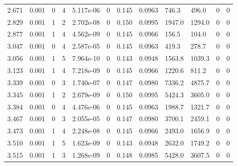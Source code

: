 \documentclass[preview]{standalone}
\begin{document}
{{\begin{tabular}{L{1.2cm}C{1.2cm} C{0.3cm}C{0.5cm} C{1.4cm}C{1.4cm} C{1.4cm}C{1.4cm} C{1.6cm}C{1.6cm} C{1.6cm}C{1.6cm}}
  2.671  &  0.001  & 0     &  4 &  5.117e-06  & 0  &  0.145&   0.0963& 746.3 & 496.0   &  0 & 0  \\ 
  2.829  &  0.001  & 1     &  2 &  2.702e-08  & 0  &  0.150&   0.0995& 1947.0 & 1294.0   &  0 & 0  \\ 
  2.877  &  0.001  & 1     &  4 &  4.562e-09  & 0  &  0.145&   0.0966& 156.5 & 104.0   &  0 & 0  \\ 
  3.047  &  0.001  & 0     &  4 &  2.587e-05  & 0  &  0.145&   0.0963& 419.3 & 278.7   &  0 & 0  \\ 
  3.056  &  0.001  & 1     &  5 &  7.964e-10  & 0  &  0.143&   0.0948& 1563.8 & 1039.3   &  0 & 0  \\ 
  3.123  &  0.001  & 1     &  4 &  7.218e-09  & 0  &  0.145&   0.0966& 1220.6 & 811.2   &  0 & 0  \\ 
  3.339  &  0.001  & 0     &  3 &  1.740e-07  & 0  &  0.147&   0.0980& 7336.2 & 4875.7   &  0 & 0  \\ 
  3.345  &  0.001  & 1     &  2 &  2.679e-09  & 0  &  0.150&   0.0995& 5424.3 & 3605.0   &  0 & 0  \\ 
  3.384  &  0.001  & 0     &  4 &  4.476e-06  & 0  &  0.145&   0.0963& 1988.7 & 1321.7   &  0 & 0  \\ 
  3.467  &  0.001  & 0     &  3 &  2.055e-05  & 0  &  0.147&   0.0980& 3700.1 & 2459.1   &  0 & 0  \\ 
  3.473  &  0.001  & 1     &  4 &  2.248e-08  & 0  &  0.145&   0.0966& 2493.0 & 1656.9   &  0 & 0  \\ 
  3.510  &  0.001  & 1     &  5 &  1.623e-09  & 0  &  0.143&   0.0948& 2632.0 & 1749.2   &  0 & 0  \\ 
  3.515  &  0.001  & 1     &  3 &  1.268e-09  & 0  &  0.148&   0.0985& 5428.0 & 3607.5   &  0 & 0  \\ 
\hline 
\end{tabular} 

}}
\end{document}

